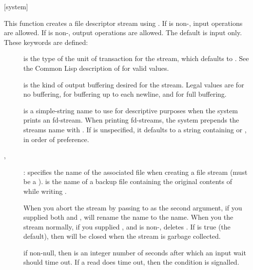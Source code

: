 {[system]{
        }

This function creates a file descriptor stream using .
If  is non-\nil, input operations are allowed.  If
 is non-\nil, output operations are allowed.  The default is
input only.  These keywords are defined:
\begin{description}
\item[] is the type of the unit of transaction for the
stream, which defaults to .  See the Common Lisp
description of  for valid values.

\item[] is the kind of output buffering desired for the stream.
Legal values are  for no buffering,  for buffering up to
each newline, and  for full buffering.

\item[] is a simple-string name to use for descriptive
purposes when the system prints an fd-stream.  When printing fd-streams,
the system prepends the streams name with .  If
 is unspecified, it defaults to a string containing 
or , in order of preference.

\item[, ]:  specifies the name of the
associated file when creating a file stream (must be a
).  is the  name
of a backup file containing the original contents of  while
writing .

When you abort the stream by passing \true{} to
 as the second argument, if you supplied both  and
,  will rename the  name to the
 name.  When you  the stream normally, if you supplied
, and  is non-\nil, 
deletes .  If  is true (the default), then
 will be closed when the stream is garbage collected.

\item[] if non-null, then  is an integer
number of seconds after which an input wait should time out.  If a read
does time out, then the  condition is signalled.
\end{description}
\enddefun

}
